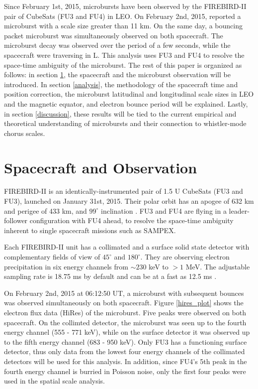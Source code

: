 \documentclass[draft,linenumbers]{agujournal}
\begin{document}
Since February 1st, 2015, microbursts have been observed by the FIREBIRD-II pair of CubeSats (FU3 and FU4) in LEO. On February 2nd, 2015, \citet{Crew16} reported a microburst with a scale size greater than 11 km. On the same day, a bouncing packet microburst was simultaneously observed on both spacecraft. The microburst decay was observed over the period of a few seconds, while the spacecraft were traversing in L. This analysis uses FU3 and FU4 to resolve the space-time ambiguity of the microburst. The rest of this paper is organized as follows: in section \ref{obs}, the spacecraft and the microburst observation will be introduced. In section \ref{analysis}, the methodology of the spacecraft time and position correction, the microburst latitudinal and longitudinal scale sizes in LEO and the magnetic equator, and electron bounce period will be explained. Lastly, in section \ref{discussion}, these results will be tied to the current empirical and theoretical understanding of microbursts and their connection to whistler-mode chorus scales.

\section{Spacecraft and Observation} \label{obs} %
FIREBIRD-II is an identically-instrumented pair of 1.5 U CubeSats (FU3 and FU3), launched on January 31st, 2015. Their polar orbit has an apogee of 632 km and perigee of 433 km, and $99^{\circ}$ inclination \citep{Crew16}. FU3 and FU4 are flying in a leader-follower configuration with FU4 ahead, to resolve the space-time ambiguity inherent to single spacecraft missions such as SAMPEX.

Each FIREBIRD-II unit has a collimated and a surface solid state detector with complementary fields of view of $45^{\circ}$ and $180^{\circ}$. They are observing electron precipitation in six energy channels from $\sim 230$ keV to $> 1$ MeV. The adjustable sampling rate is 18.75 ms by default and can be at a fast as 12.5 ms \citep{Crew16}. 

On February 2nd, 2015 at 06:12:50 UT, a microburst with subsequent bounces was observed simultaneously on both spacecraft. Figure \ref{hires_plot} shows the electron flux data (HiRes) of the microburst. Five peaks were observed on both spacecraft. On the collimted detector, the microburst was seen up to the fourth energy channel (555 - 771 keV), while on the surface detector it was observed up to the fifth energy channel (683 - 950 keV). Only FU3 has a functioning surface detector, thus only data from the lowest four energy channels of the collimated detectors will be used for this analysis. In addition, since FU4's 5th peak in the fourth energy channel is burried in Poisson noise, only the first four peaks were used in the spatial scale analysis.
\end{document}
